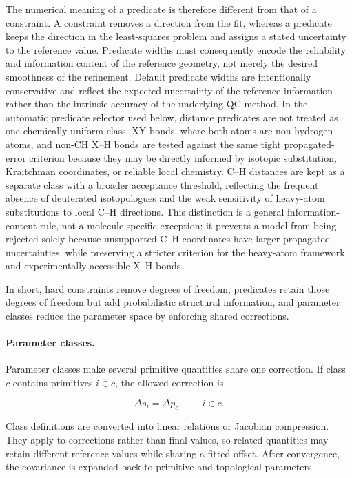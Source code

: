\documentclass[aip,jcp,reprint,longbibliography,floatfix]{revtex4-2}
\begin{document}
The numerical meaning of a predicate is therefore different from that of a
constraint. A constraint removes a direction from the fit, whereas a predicate
keeps the direction in the least-squares problem and assigns a stated
uncertainty to the reference value. Predicate widths must consequently encode
the reliability and information content of the reference geometry, not merely
the desired smoothness of the refinement. Default predicate widths are
intentionally conservative and reflect the expected uncertainty of the
reference information rather than the intrinsic accuracy of the underlying QC
method. In the automatic predicate selector
used below, distance predicates are not treated as one chemically uniform
class. XY bonds, where both atoms are non-hydrogen atoms, and non-CH X--H bonds
are tested against the same tight propagated-error criterion because they may
be directly informed by isotopic substitution, Kraitchman coordinates, or
reliable local chemistry. C--H distances are kept as a separate class with a
broader acceptance threshold, reflecting the frequent absence of deuterated
isotopologues and the weak sensitivity of heavy-atom substitutions to local
C--H directions. This distinction is a general information-content rule, not a
molecule-specific exception: it prevents a model from being rejected solely
because unsupported C--H coordinates have larger propagated uncertainties,
while preserving a stricter criterion for the heavy-atom framework and
experimentally accessible X--H bonds.

In short, hard constraints remove degrees of freedom, predicates retain those
degrees of freedom but add probabilistic structural information, and parameter
classes reduce the parameter space by enforcing shared corrections.

\paragraph{Parameter classes.}

Parameter classes make several primitive quantities share one correction. If
class $c$ contains primitives $i\in c$, the allowed correction is

\begin{equation}
\Delta s_i
=
\Delta p_c,
\qquad
i\in c .
\end{equation}

Class definitions are converted into linear relations or Jacobian compression.
They apply to corrections rather than final values, so related quantities may
retain different reference values while sharing a fitted offset. After
convergence, the covariance is expanded back to primitive and topological
parameters.
\end{document}
